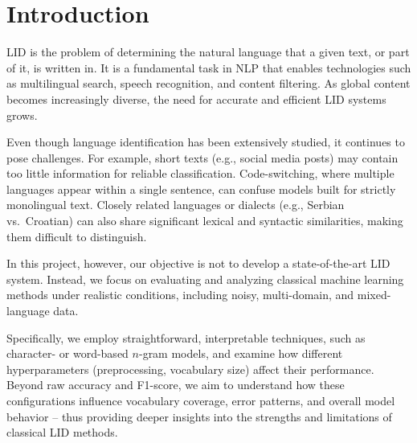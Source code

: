 \section{Introduction}\label{sec:intro}

LID is the problem of determining the natural language that a given text, or part of it, is written in. It is a fundamental task in NLP that enables technologies such as multilingual search, speech recognition, and content filtering. As global content becomes increasingly diverse, the need for accurate and efficient LID systems grows. \cite{Jauhiainen2019}

Even though language identification has been extensively studied, it continues to pose challenges. For example, short texts (e.g., social media posts) may contain too little information for reliable classification. Code-switching, where multiple languages appear within a single sentence, can confuse models built for strictly monolingual text. Closely related languages or dialects (e.g., Serbian vs.\ Croatian) can also share significant lexical and syntactic similarities, making them difficult to distinguish. \cite{Vatanen2010}

In this project, however, our objective is not to develop a state-of-the-art LID system. Instead, we focus on evaluating and analyzing classical machine learning methods under realistic conditions, including noisy, multi-domain, and mixed-language data.

Specifically, we employ straightforward, interpretable techniques, such as character- or word-based $n$-gram models, and examine how different hyperparameters  (preprocessing, vocabulary size) affect their performance. Beyond raw accuracy and F1-score, we aim to understand how these configurations influence vocabulary coverage, error patterns, and overall model behavior -- thus providing deeper insights into the strengths and limitations of classical LID methods.